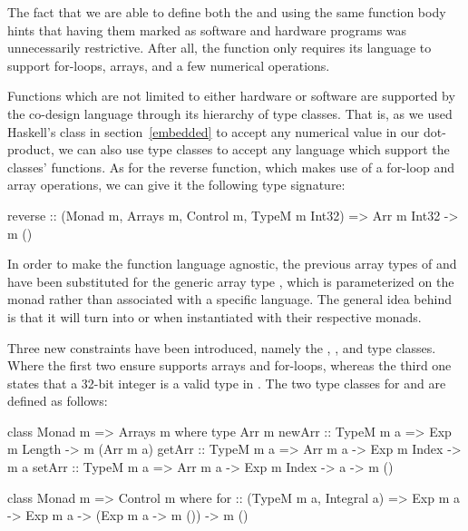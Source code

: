 \documentclass[../main.tex]{subfiles}
\begin{document}

The fact that we are able to define both the  and  using the same function body hints that having them marked as software and hardware programs was unnecessarily restrictive. After all, the function only requires its language to support for-loops, arrays, and a few numerical operations.

Functions which are not limited to either hardware or software are supported by the co-design language through its hierarchy of type classes. That is, as we used Haskell's  class in section~\ref{embedded} to accept any numerical value in our dot-product, we can also use type classes to accept any language which support the classes' functions. As for the reverse function, which makes use of a for-loop and array operations, we can give it the following type signature:

\begin{code}
reverse :: (Monad m, Arrays m, Control m, TypeM m Int32)
        => Arr m Int32 -> m ()
\end{code}

\noindent In order to make the function language agnostic, the previous array types of  and  have been substituted for the generic array type , which is parameterized on the monad  rather than associated with a specific language. The general idea behind  is that it will turn into  or  when instantiated with their respective monads.

Three new constraints have been introduced, namely the , , and  type classes. Where the first two ensure  supports arrays and for-loops, whereas the third one states that a 32-bit integer is a valid type in . The two type classes for  and  are defined as follows:

\begin{code}
class Monad m => Arrays m where
  type Arr m
  newArr :: TypeM m a => Exp m Length -> m (Arr m a)
  getArr :: TypeM m a => Arr m a -> Exp m Index -> m a
  setArr :: TypeM m a => Arr m a -> Exp m Index -> a -> m ()

class Monad m => Control m where
  for :: (TypeM m a, Integral a) => Exp m a -> Exp m a -> (Exp m a -> m ())
      -> m ()
\end{code}
\end{document}
